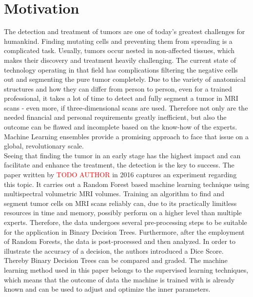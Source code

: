 \documentclass[
12pt,
headsepline,
bibliography=totoc,
twoside=semi,
fleqn
]{scrartcl}
\begin{document}

\section{Motivation\label{sec:sec1}}
The detection and treatment of tumors are one of today's greatest challenges for humankind. Finding mutating cells and preventing them from spreading is a complicated task. Usually, tumors occur nested in non-affected tissues, which makes their discovery and treatment heavily challenging. The current state of technology operating in that field has complications filtering the negative cells out and segmenting the pure tumor completely. Due to the variety of anatomical structures and how they can differ from person to person, even for a trained professional, it takes a lot of time to detect and fully segment a tumor in MRI scans - even more, if three-dimensional scans are used. Therefore not only are the needed financial and personal requirements greatly inefficient, but also the outcome can be flawed and incomplete based on the know-how of the experts. Machine Learning ensembles provide a promising approach to face that issue on a global, revolutionary scale.\\

Seeing that finding the tumor in an early stage has the highest impact and can facilitate and enhance the treatment, the detection is the key to success. The paper written by \textcolor{red}{TODO AUTHOR} in 2016 captures an experiment regarding this topic. It carries out a Random Forest based machine learning technique using multispectral volumetric MRI volumes. Training an algorithm to find and segment tumor cells on MRI scans reliably can, due to its practically limitless resources in time and memory, possibly perform on a higher level than multiple experts. Therefore, the data undergoes several pre-processing steps to be suitable for the application in Binary Decision Trees. Furthermore, after the employment of Random Forests, the data is post-processed and then analyzed. In order to illustrate the accuracy of a decision, the authors introduced a Dice Score. Thereby Binary Decision Trees can be compared and graded. The machine learning method used in this paper belongs to the supervised learning techniques, which means that the outcome of data the machine is trained with is already known and can be used to adjust and optimize the inner parameters.\\
\end{document}
